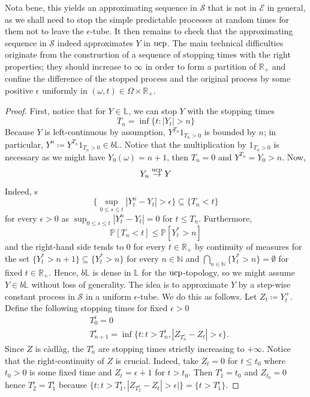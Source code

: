 \documentclass[11pt,a4paper,twoside,openany]{report}
\numberwithin{equation}{section}
\theoremstyle{plain} %
\theoremstyle{definition} %
\theoremstyle{remark} %
\begin{document}
Nota bene, this yields an approximating sequence in \(\mathcal{S}\) that is not in \(\mathcal{E}\) in general, as we shall need to stop the simple predictable processes at random times for them not to leave the \(\epsilon\)-tube. It then remains to check that the approximating sequence in \(\mathcal{S}\) indeed approximates \(Y\) in \(\rm{ucp}\). The main technical difficulties originate from the construction of a sequence of stopping times with the right properties; they should increase to \(\infty\) in order to form a partition of \(\mathbb{R}_+\) and confine the difference of the stopped process and the original process by some positive \(\epsilon\) uniformly in \((\omega,t)\in\Omega\times\mathbb{R}_+\). 
\begin{proof}
 First, notice that for \(Y\in\mathbb{L}\), we can stop \(Y\) with the stopping times 
    \begin{equation*}
        T_n=\inf\{t:|Y_t|>n\}
    \end{equation*}
    Because \(Y\) is left-continuous by assumption, \(Y^{T_n}1_{T_n>0}\) is bounded by \(n\); in particular, \(Y^n\coloneqq Y^{T_n}1_{T_n>0}\in b\mathbb{L}\). Notice that the multiplication by \(1_{T_n>0}\) is necessary as we might have \(Y_0(\omega)=n+1\), then \(T_n=0\) and \(Y^{T_n}=Y_0>n\). Now,
    \begin{equation*}
        Y_n\overset{\rm{ucp}}{\to}Y
    \end{equation*}
 Indeed,
s    \begin{equation*}
        \{\sup_{0\leq s\leq t}|Y_t^n-Y_t|>\epsilon\}\subseteq \{T_n< t\}
    \end{equation*}
    for every \(\epsilon>0\) as \(\sup_{0\leq s\leq t}|Y_t^n-Y_t|=0\) for \(t\leq T_n\). Furthermore, 
    \begin{equation*}
        \mathbb{P}[T_n< t]\leq\mathbb{P}[Y_t^*>n]
    \end{equation*}
    and the right-hand side tends to \(0\) for every \(t\in\mathbb{R}_+\) by continuity of measures for the set \(\{Y_t^*>n+1\}\subseteq\{Y_t^*>n\}\) for every \(n\in\mathbb{N}\) and \(\bigcap_{n\in\mathbb{N}}\{Y_t^*>n\}=\emptyset\) for fixed \(t\in\mathbb{R}_+\). Hence, \(b\mathbb{L}\) is dense in \(\mathbb{L}\) for the \(\rm{ucp}\)-topology, so we might assume \(Y\in b\mathbb{L}\) without loss of generality. The idea is to approximate \(Y\) by a step-wise constant process in \(\mathcal{S}\) in a uniform \(\epsilon\)-tube. We do this as follows. Let 
    \(Z_t\coloneqq Y_t^{+}\). Define the following stopping times for fixed \(\epsilon>0\)
    \begin{align*}
        &T_0^{\epsilon}=0\\
        &T_{n+1}^{\epsilon}=\inf\{t:t>T_{n}^{\epsilon},|Z _{T_{n}^{\epsilon}}-Z_t|>\epsilon\}.
    \end{align*}
    Since \(Z\) is càdlàg, the \(T_n^{\epsilon}\) are stopping times strictly increasing to \(+\infty\). Notice that the right-continuity of \(Z\) is crucial. Indeed, take \(Z_t=0\) for \(t\leq t_0\) where \(t_0>0\) is some fixed time and \(Z_t=\epsilon+1\) for \(t>t_0\). Then \(T_1^{\epsilon}=t_0\) and \(Z_{t_0}=0\) hence \(T_2^{\epsilon}=T_1^{\epsilon}\) because \(\{t:t>T_1^{\epsilon},|Z _{T_{2}^{\epsilon}}-Z_t|>\epsilon|\}=\{t>T_1^{\epsilon}\}\). 
    

\end{proof}
\end{document}
